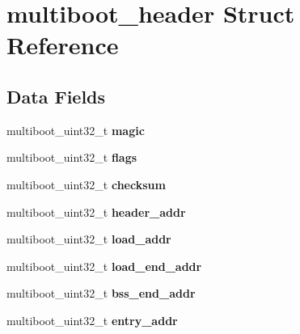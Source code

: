 \hypertarget{structmultiboot__header}{}\section{multiboot\+\_\+header Struct Reference}
\label{structmultiboot__header}
\subsection*{Data Fields}
\begin{DoxyCompactItemize}
\item 
multiboot\+\_\+uint32\+\_\+t {\bfseries magic}\hypertarget{structmultiboot__header_a7fddee92e60ff58e159c6bf2c40bf29b}{}\label{structmultiboot__header_a7fddee92e60ff58e159c6bf2c40bf29b}

\item 
multiboot\+\_\+uint32\+\_\+t {\bfseries flags}\hypertarget{structmultiboot__header_ab922f32c179ec7bde91519d19f27d95b}{}\label{structmultiboot__header_ab922f32c179ec7bde91519d19f27d95b}

\item 
multiboot\+\_\+uint32\+\_\+t {\bfseries checksum}\hypertarget{structmultiboot__header_a17e73abddfe8264c254767a20099038d}{}\label{structmultiboot__header_a17e73abddfe8264c254767a20099038d}

\item 
multiboot\+\_\+uint32\+\_\+t {\bfseries header\+\_\+addr}\hypertarget{structmultiboot__header_a9718b2fc6ce29a37e9a209f92ab856e3}{}\label{structmultiboot__header_a9718b2fc6ce29a37e9a209f92ab856e3}

\item 
multiboot\+\_\+uint32\+\_\+t {\bfseries load\+\_\+addr}\hypertarget{structmultiboot__header_a99de1cf326c46c76c6039f317b7a1ef2}{}\label{structmultiboot__header_a99de1cf326c46c76c6039f317b7a1ef2}

\item 
multiboot\+\_\+uint32\+\_\+t {\bfseries load\+\_\+end\+\_\+addr}\hypertarget{structmultiboot__header_ac9efc1a4c3cd18f286b2fd50ff052e31}{}\label{structmultiboot__header_ac9efc1a4c3cd18f286b2fd50ff052e31}

\item 
multiboot\+\_\+uint32\+\_\+t {\bfseries bss\+\_\+end\+\_\+addr}\hypertarget{structmultiboot__header_ab4f2496ec9b0d1a95985929d281dfa19}{}\label{structmultiboot__header_ab4f2496ec9b0d1a95985929d281dfa19}

\item 
multiboot\+\_\+uint32\+\_\+t {\bfseries entry\+\_\+addr}\hypertarget{structmultiboot__header_ac3d807775a9d69730e6698dcdcf6491e}{}\label{structmultiboot__header_ac3d807775a9d69730e6698dcdcf6491e}


\end{DoxyCompactItemize}
